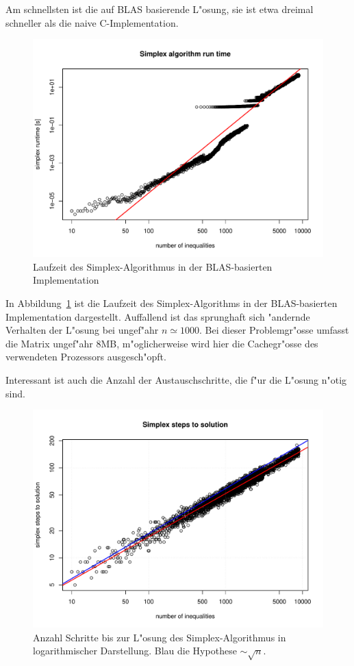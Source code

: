 Am schnellsten ist die auf BLAS basierende L"osung, sie ist etwa dreimal
schneller als die naive C-Implementation.

\begin{figure}
\begin{center}
\includegraphics[width=\hsize]{add/runtime.pdf}
\end{center}
\caption{Laufzeit des Simplex-Algorithmus in der BLAS-basierten
Implementation\label{simplex:runtime}}
\end{figure}
In Abbildung~\ref{simplex:runtime} ist  die Laufzeit des Simplex-Algorithms
in der BLAS-basierten Implementation dargestellt.  Auffallend
ist das sprunghaft sich "andernde Verhalten der L"osung bei ungef"ahr
$n\simeq 1000$. Bei dieser Problemgr"osse umfasst die Matrix
ungef"ahr 8MB, m"oglicherweise wird hier die Cachegr"osse des
verwendeten Prozessors ausgesch"opft.

Interessant ist auch die Anzahl der Austauschschritte, die f"ur die
L"osung n"otig sind. 
\begin{figure}
\begin{center}
\includegraphics[width=\hsize]{add/pathsteploghyp.pdf}
\end{center}
\caption{Anzahl Schritte bis zur L"osung des Simplex-Algorithmus
in logarithmischer Darstellung.
Blau die Hypothese $\sim\sqrt{n}$.
\label{simplex:pathsteps}}
\end{figure}

